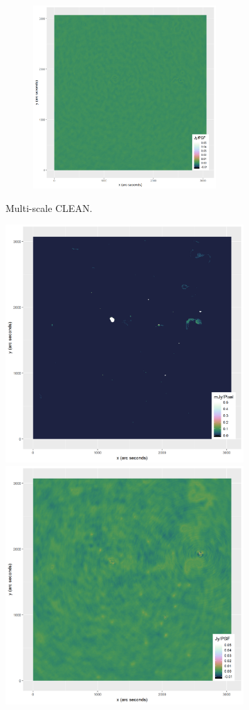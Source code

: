 \begin{figure}[!htp]
\begin{subfigure}[b]{0.82\linewidth}
\begin{subfigure}{0.49\linewidth}
			\includegraphics[width=1.0\linewidth]{./chapters/10.results/MSClean/Natural-CLEAN-residuals.png}
		\end{subfigure}
		\caption{Multi-scale CLEAN.}
		\label{results:comp:clean}
	\end{subfigure}
	\begin{subfigure}[b]{0.82\linewidth}
		\centering
		\includegraphics[width=0.490\linewidth]{./chapters/10.results/SerialCD/CD-reference.png}
		\includegraphics[width=0.490\linewidth]{./chapters/10.results/SerialCD/CD-reference-residuals.png}

\end{subfigure}
\end{figure}
